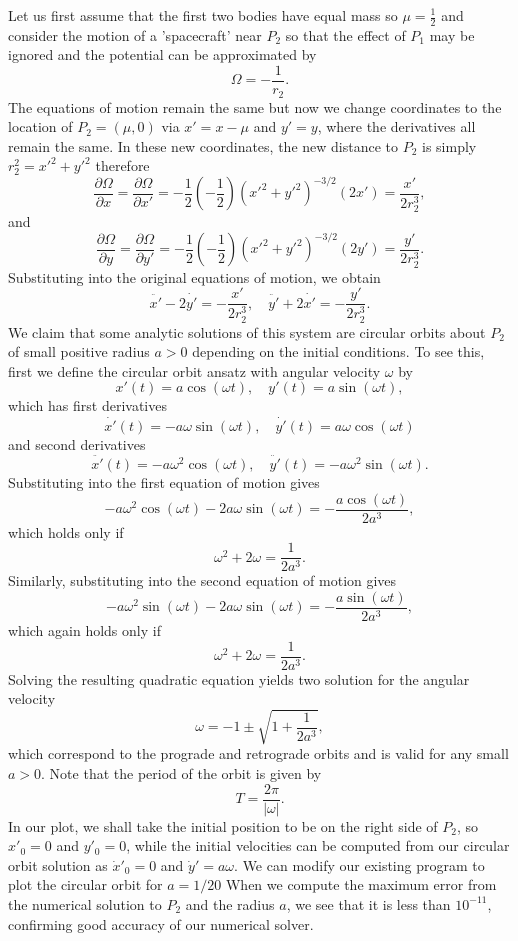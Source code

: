 \documentclass{article}
\begin{document}
Let us first assume that the first two bodies have equal mass so \(\mu = \frac{1}{2}\) and consider the motion of a 'spacecraft' near \(P_2\) so that the effect of \(P_1\) may be ignored and the potential can be approximated by
\[ \Omega = -\frac{1}{r_2}. \]
The equations of motion remain the same but now we change coordinates to the location of \(P_2 = (\mu, 0)\) via \(x' = x - \mu\) and \(y' = y\), where the derivatives all remain the same. In these new coordinates, the new distance to \(P_2\) is simply \(r_2^2 = x'^2 + y'^2\) therefore 
\[ \frac{\partial\Omega}{\partial x} = \frac{\partial\Omega}{\partial x'} = -\frac{1}{2} \left(-\frac{1}{2}\right) (x'^2 + y'^2)^{-3/2} (2x') = \frac{x'}{2r_2^3}, \]
and
\[ \frac{\partial\Omega}{\partial y} = \frac{\partial\Omega}{\partial y'} = -\frac{1}{2} \left(-\frac{1}{2}\right) (x'^2 + y'^2)^{-3/2} (2y') = \frac{y'}{2r_2^3}. \]
Substituting into the original equations of motion, we obtain
\[ \ddot{x'} - 2\dot{y'} = -\frac{x'}{2r_2^3}, \quad \ddot{y'} + 2\dot{x'} = -\frac{y'}{2r_2^3}. \]
We claim that some analytic solutions of this system are circular orbits about \(P_2\) of small positive radius \(a>0\) depending on the initial conditions. To see this, first we define the circular orbit ansatz with angular velocity \(\omega\) by
\[ x'(t) = a\cos(\omega t), \quad y'(t) = a\sin(\omega t), \]
which has first derivatives
\[ \dot{x'}(t) = -a\omega \sin(\omega t), \quad \dot{y'}(t) = a\omega \cos(\omega t) \]
and second derivatives
\[ \ddot{x'}(t) = -a\omega^2 \cos(\omega t), \quad \ddot{y'}(t) = -a\omega^2 \sin(\omega t). \]
Substituting into the first equation of motion gives
\[ -a\omega^2 \cos(\omega t) - 2a\omega \sin(\omega t) = -\frac{a\cos(\omega t)}{2a^3}, \]
which holds only if
\[ \omega^2 + 2\omega = \frac{1}{2a^3}. \]
Similarly, substituting into the second equation of motion gives
\[ -a\omega^2 \sin(\omega t) - 2a\omega \sin(\omega t) = -\frac{a\sin(\omega t)}{2a^3}, \]
which again holds only if
\[ \omega^2 + 2\omega = \frac{1}{2a^3}. \]
Solving the resulting quadratic equation yields two solution for the angular velocity
\[ \omega = -1 \pm \sqrt{1 + \frac{1}{2a^3}}, \]
which correspond to the prograde and retrograde orbits and is valid for any small \(a > 0\). Note that the period of the orbit is given by
\[ T = \frac{2\pi}{|\omega|}. \]
In our plot, we shall take the initial position to be on the right side of \(P_2\), so \(x'_0 = 0\) and \(y'_0 = 0\), while the initial velocities can be computed from our circular orbit solution as \(\dot{x}'_0 = 0\) and \(\dot{y}' = a\omega\). We can modify our existing program to plot the circular orbit for \(a = 1/20\) When we compute the maximum error from the numerical solution to \(P_2\) and the radius \(a\), we see that it is less than \(10^{-11}\), confirming good accuracy of our numerical solver.
\end{document}
